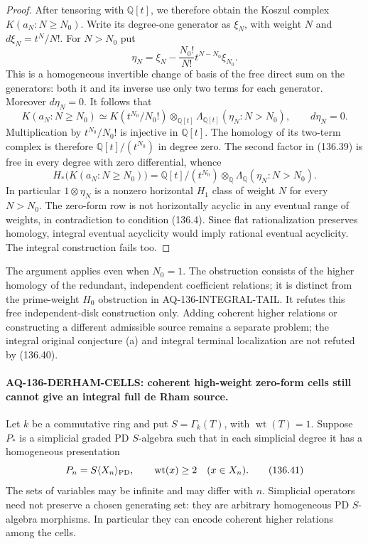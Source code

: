 \begin{proof}
After tensoring with $\mathbb Q[t]$, we therefore
obtain the Koszul complex $K(a_N:N\geq N_0)$.
Write its degree-one generator as $\xi_N$, with
weight $N$ and $d\xi_N=t^N/N!$.  For $N>N_0$ put
\[
 \eta_N=\xi_N-
              \frac{N_0!}{N!}t^{N-N_0}\xi_{N_0}.
                                                               \tag{136.38}
\]
This is a homogeneous invertible change of basis
of the free direct sum on the generators: both
it and its inverse use only two terms for each
generator.  Moreover $d\eta_N=0$.  It follows that
\[
 K(a_N:N\geq N_0)
  \simeq K(t^{N_0}/N_0!)\otimes_{\mathbb Q[t]}
                 \Lambda_{\mathbb Q[t]}(\eta_N:N>N_0),
                  \qquad d\eta_N=0.                       \tag{136.39}
\]
Multiplication by $t^{N_0}/N_0!$ is injective in
$\mathbb Q[t]$.  The homology of its two-term complex
is therefore $\mathbb Q[t]/(t^{N_0})$ in degree zero.
The second factor in (136.39) is free in every
degree with zero differential, whence
\[
 H_*\bigl(K(a_N:N\geq N_0)\bigr)
  =\mathbb Q[t]/(t^{N_0})\otimes_{\mathbb Q}
                         \Lambda_{\mathbb Q}(\eta_N:N>N_0).
                                                               \tag{136.40}
\]
In particular $1\otimes\eta_N$ is a nonzero
horizontal $H_1$ class of weight $N$ for every
$N>N_0$.  The zero-form row is not horizontally
acyclic in any eventual range of weights, in
contradiction to condition (136.4).  Since flat
rationalization preserves homology, integral
eventual acyclicity would imply rational eventual
acyclicity.  The integral construction fails too.
\end{proof}

The argument applies even when $N_0=1$.  The
obstruction consists of the higher homology of
the redundant, independent coefficient relations;
it is distinct from the prime-weight $H_0$
obstruction in AQ-136-INTEGRAL-TAIL.  It refutes
this free independent-disk construction only.
Adding coherent higher relations or constructing
a different admissible source remains a separate
problem; the integral original conjecture (a)
and integral terminal localization are not
refuted by (136.40).


\paragraph{AQ-136-DERHAM-CELLS: coherent high-weight zero-form cells still cannot give an integral full de Rham source.}
Let $k$ be a commutative ring and put $S=\Gamma_k(T)$,
with $\operatorname{wt}(T)=1$.  Suppose $P_*$ is a
simplicial graded PD $S$-algebra such that in each
simplicial degree it has a homogeneous presentation
\[
                  P_n=S\langle X_n\rangle_{\rm PD},
           \qquad \operatorname{wt}(x)\geq2
                      \quad(x\in X_n).                    \tag{136.41}
\]
The sets of variables may be infinite and may differ
with $n$.  Simplicial operators need not preserve a
chosen generating set: they are arbitrary homogeneous
PD $S$-algebra morphisms.  In particular they can encode
coherent higher relations among the cells.

